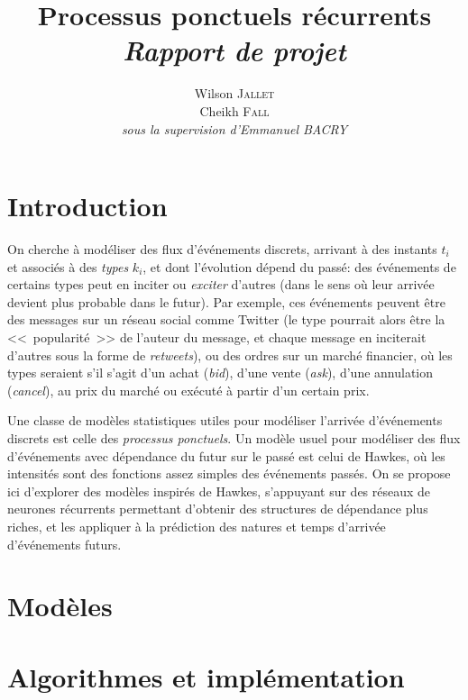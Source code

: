 \documentclass[11pt]{article}
\title{\textbf{Processus ponctuels récurrents}\\
	\textit{Rapport de projet}  
}
\author{
  Wilson \textsc{Jallet}\\
  Cheikh \textsc{Fall}\\
  \textit{sous la supervision d'Emmanuel BACRY}
}
\begin{document}
\maketitle

\section{Introduction}

On cherche à modéliser des flux d'événements discrets, arrivant à des instants $t_i$ et associés à des \textit{types} $k_i$, et dont l'évolution dépend du passé: des événements de certains types peut en inciter ou \textit{exciter} d'autres (dans le sens où leur arrivée devient plus probable dans le futur). Par exemple, ces événements peuvent être des messages sur un réseau social comme Twitter (le type pourrait alors être la <<~popularité~>> de l'auteur du message, et chaque message en inciterait d'autres sous la forme de \textit{retweets}), ou des ordres sur un marché financier, où les types seraient s'il s'agit d'un achat (\textit{bid}), d'une vente (\textit{ask}), d'une annulation (\textit{cancel}), au prix du marché ou exécuté à partir d'un certain prix.

Une classe de modèles statistiques utiles pour modéliser l'arrivée d'événements discrets est celle des \textit{processus ponctuels}. Un modèle usuel pour modéliser des flux d'événements avec dépendance du futur sur le passé est celui de Hawkes, où les intensités sont des fonctions assez simples des événements passés. On se propose ici d'explorer des modèles inspirés de Hawkes, s'appuyant sur des réseaux de neurones récurrents permettant d'obtenir des structures de dépendance plus riches, et les appliquer à la prédiction des natures et temps d'arrivée d'événements futurs.

\section{Modèles}




\section{Algorithmes et implémentation}




\printbibliography
\end{document}
